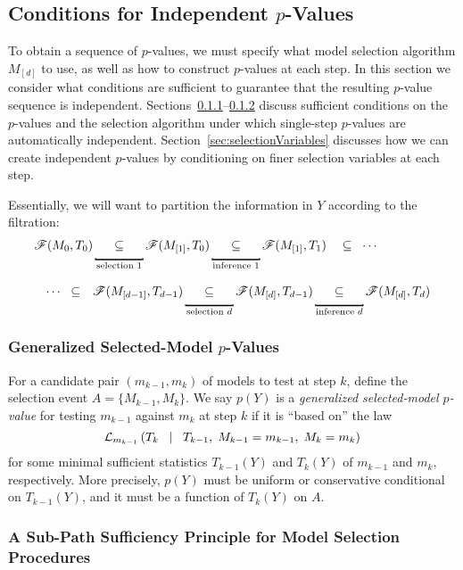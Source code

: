 \documentclass{article}
\begin{document}
\subsection{Conditions for Independent $p$-Values}\label{sec:sufficiency}

To obtain a sequence of $p$-values, we must specify what model selection algorithm $M_{[d]}$ to use, as well as how to construct $p$-values at each step. In this section we consider what conditions are sufficient to guarantee that the resulting $p$-value sequence is independent. Sections~\ref{sec:pvalSP}--\ref{sec:modelSPSP} discuss sufficient conditions on the $p$-values and the selection algorithm under which single-step $p$-values are automatically independent. Section~\ref{sec:selectionVariables} discusses how we can create independent $p$-values by conditioning on finer selection variables at each step.

Essentially, we will want to partition the information in $Y$ according to the filtration:
\begin{align}\nonumber
  \sF(M_0,T_0) &\underlabel_{\text{selection } 1} 
  \sF(M_{[1]},T_0) \underlabel_{\text{inference } 1}
  \sF(M_{[1]},T_1) \quad \sub \;\;\cdots\\[8pt]
  \label{eq:infoPartition}
  \cdots\;\; \sub \quad&
  \sF(M_{[d-1]},T_{d-1}) \underlabel_{\text{selection } d}
  \sF(M_{[d]},T_{d-1}) 
  \underlabel_{\text{inference } d}
  \sF(M_{[d]}, T_d)
\end{align}

\subsubsection{Generalized Selected-Model $p$-Values}\label{sec:pvalSP}

For a candidate pair $(m_{k-1},m_k)$ of models to test at step $k$, define the selection event $A = \{M_{k-1},M_k\}$. We say $p(Y)$ is a {\em generalized selected-model $p$-value} for testing $m_{k-1}$ against $m_k$ at step $k$ if it is ``based on'' the law
\[
\mathcal{L}_{m_{k-1}}\left(T_k \;\;\mid\;\; T_{k-1},\; M_{k-1}=m_{k-1},\;M_k=m_k\right)
\]
for some minimal sufficient statistics $T_{k-1}(Y)$ and $T_k(Y)$ of $m_{k-1}$ and $m_k$, respectively. More precisely, $p(Y)$ must be uniform or conservative conditional on $T_{k-1}(Y)$, and it must be a function of $T_k(Y)$ on $A$.

\subsubsection{A Sub-Path Sufficiency Principle for Model Selection Procedures}\label{sec:modelSPSP}
\end{document}
